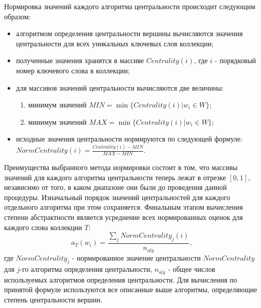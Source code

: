 Нормировка значений каждого алгоритма центральности происходит следующим образом:
\begin{itemize}
    \item алгоритмом определения центральности вершины вычисляются значения центральности для всех уникальных ключевых слов коллекции; 
    \item полученные значения хранятся в массиве $Centrality(i)$, где $i$ - порядковый номер ключевого слова в коллекции;
    \item для массивов значений центральности вычисляются две величины:
            \begin{enumerate}
                \item минимум значений $MIN = \min{\{Centrality(i) | w_i \in W\}}$;
                \item минимум значений $MAX = \min{\{Centrality(i) | w_i \in W\}}$;
            \end{enumerate}
    \item исходные значения центральности нормируются по следующей формуле: $NormCentrality(i) = \frac{Centrality(i) - MIN}{MAX - MIN}$.
\end{itemize}

Преимущества выбранного метода нормировки состоит в том, что массивы значений для каждого алгоритма центральности теперь лежат в отрезке $[0, 1]$, независимо от того, в каком диапазоне они были до проведения данной процедуры. Изначальный порядок значений центральностей для каждого отдельного алгоритма при этом сохраняется. Финальным этапом вычисления степени абстрактности является усреднение всех нормированных оценок для каждого слова коллекции $T$:
$$ a_T(w_i) = \frac{\sum_j{NormCentrality_j(i)}}{n_{alg}},$$
где $NormCentrality_j$ - нормированное значение центральности $NormCentrality$ для $j$-го алгоритма определения центральности, $n_{alg}$ - общее числов используемых алгоритмов определения центральности. Для вычисления по принятой формуле используются все описанные выше алгоритмы, определяющие степень центральности вершин.

